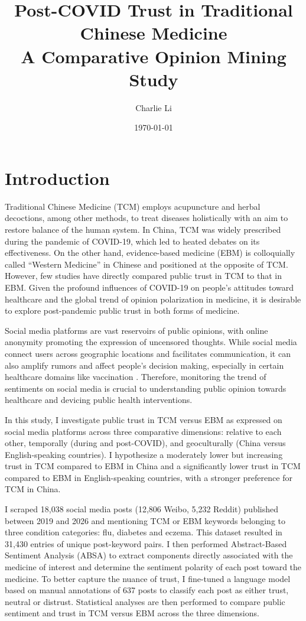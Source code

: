 \documentclass[11pt]{article}
\title{Post-COVID Trust in Traditional Chinese Medicine\\[0.5em] \large A Comparative Opinion Mining Study}
\author{Charlie Li}
\date{\today}
\begin{document}
\maketitle

\section{Introduction}

Traditional Chinese Medicine (TCM) employs acupuncture and herbal decoctions, among other methods, to treat diseases holistically with an aim to restore balance of the human system. In China, TCM was widely prescribed during the pandemic of COVID-19, which led to heated debates on its effectiveness. On the other hand, evidence-based medicine (EBM) is colloquially called “Western Medicine” in Chinese and positioned at the opposite of TCM. However, few studies have directly compared public trust in TCM to that in EBM. Given the profound influences of COVID-19 on people's attitudes toward healthcare and the global trend of opinion polarization in medicine, it is desirable to explore post-pandemic public trust in both forms of medicine.

Social media platforms are vast reservoirs of public opinions, with online anonymity promoting the expression of uncensored thoughts. While social media connect users across geographic locations and facilitates communication, it can also amplify rumors and affect people's decision making, especially in certain healthcare domains like vaccination \parencite{piedrahitavalds_2021_vaccine}. Therefore, monitoring the trend of sentiments on social media is crucial to understanding public opinion towards healthcare and devicing public health interventions.

In this study, I investigate public trust in TCM versus EBM as expressed on social media platforms across three comparative dimensions: relative to each other, temporally (during and post-COVID), and geoculturally (China versus English-speaking countries). I hypothesize a moderately lower but increasing trust in TCM compared to EBM in China and a significantly lower trust in TCM compared to EBM in English-speaking countries, with a stronger preference for TCM in China.

I scraped 18,038 social media posts (12,806 Weibo, 5,232 Reddit) published between 2019 and 2026 and mentioning TCM or EBM keywords belonging to three condition categories: flu, diabetes and eczema. This dataset resulted in 31,430 entries of unique post-keyword pairs. I then performed Abstract-Based Sentiment Analysis (ABSA) to extract components directly associated with the medicine of interest and determine the sentiment polarity of each post toward the medicine. To better capture the nuance of trust, I fine-tuned a language model based on manual annotations of 637 posts to classify each post as either trust, neutral or distrust. Statistical analyses are then performed to compare public sentiment and trust in TCM versus EBM across the three dimensions.
\end{document}
